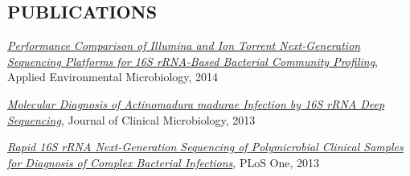 \documentclass{res}
\begin{document}
\begin{resume}
\section{PUBLICATIONS}
\renewcommand{\section}[2]{}
\begin{thebibliography}{3}
    \href{http://aem.asm.org/content/80/24/7583}
         {\textit{Performance Comparison of Illumina and Ion Torrent 
                  Next-Generation Sequencing Platforms for 16S rRNA-Based 
                  Bacterial Community Profiling}},
         Applied Environmental Microbiology, 2014

    \href{http://jcm.asm.org/content/51/12/4262}
         {\textit{Molecular Diagnosis of Actinomadura madurae 
                  Infection by 16S rRNA Deep Sequencing}},
         Journal of Clinical Microbiology, 2013

    \href{http://journals.plos.org/plosone/article?id=10.1371/journal.pone.0065226}
         {\textit{Rapid 16S rRNA Next-Generation Sequencing of Polymicrobial 
                  Clinical Samples for Diagnosis of Complex Bacterial Infections}},
         PLoS One, 2013
\end{thebibliography}
\nocite{*}

\end{resume}
\end{document}
